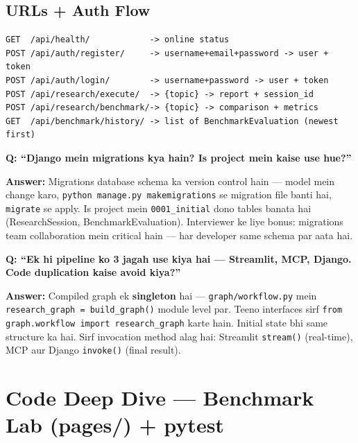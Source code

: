 \documentclass[11pt, a4paper]{article}
\begin{document}
\subsection{URLs + Auth Flow}

\begin{lstlisting}[style=jsonstyle, caption={API Endpoint Map}]
GET  /api/health/            -> online status
POST /api/auth/register/     -> username+email+password -> user + token
POST /api/auth/login/        -> username+password -> user + token
POST /api/research/execute/  -> {topic} -> report + session_id
POST /api/research/benchmark/-> {topic} -> comparison + metrics
GET  /api/benchmark/history/ -> list of BenchmarkEvaluation (newest first)
\end{lstlisting}

\begin{interviewbox}
\textbf{Q: ``Django mein migrations kya hain? Is project mein kaise use hue?''}

\textbf{Answer:} Migrations database schema ka version control hain --- model mein change karo, \texttt{python manage.py makemigrations} se migration file banti hai, \texttt{migrate} se apply. Is project mein \texttt{0001\_initial} dono tables banata hai (ResearchSession, BenchmarkEvaluation). Interviewer ke liye bonus: migrations team collaboration mein critical hain --- har developer same schema par aata hai.
\end{interviewbox}

\begin{interviewbox}
\textbf{Q: ``Ek hi pipeline ko 3 jagah use kiya hai --- Streamlit, MCP, Django. Code duplication kaise avoid kiya?''}

\textbf{Answer:} Compiled graph ek \textbf{singleton} hai --- \texttt{graph/workflow.py} mein \texttt{research\_graph = build\_graph()} module level par. Teeno interfaces sirf \texttt{from graph.workflow import research\_graph} karte hain. Initial state bhi same structure ka hai. Sirf invocation method alag hai: Streamlit \texttt{stream()} (real-time), MCP aur Django \texttt{invoke()} (final result).
\end{interviewbox}

\section{Code Deep Dive --- Benchmark Lab (pages/) + pytest}
\end{document}
